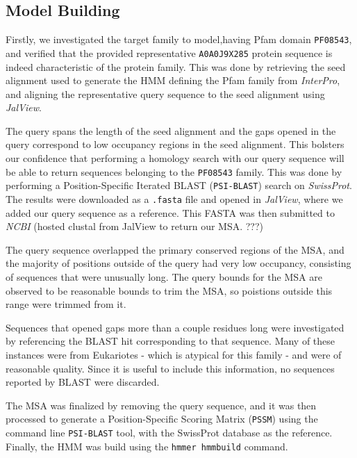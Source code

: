 \documentclass[10pt,twocolumn,letterpaper]{article}
\begin{document}
\subsection{Model Building}

Firstly, we investigated the target family to model,having Pfam domain \texttt{PF08543}, and verified that the provided representative \texttt{A0A0J9X285} protein sequence is indeed characteristic of the protein family. 
This was done by retrieving the seed alignment used to generate the HMM defining the Pfam family from \textit{InterPro}, and aligning the representative query sequence to the seed alignment using \textit{JalView}.

The query spans the length of the seed alignment and the gaps opened in the query correspond to low occupancy regions in the seed alignment. This bolsters our confidence that performing a homology search with our query sequence will be able to return sequences belonging to the \texttt{PF08543} family. This was done by performing a Position-Specific Iterated BLAST (\texttt{PSI-BLAST}) search on \textit{SwissProt}. The results were downloaded as a \texttt{.fasta} file and opened in \textit{JalView}, where we added our query sequence as a reference. This FASTA was then submitted to \textit{NCBI} (hosted clustal from JalView to return our MSA. ???)

The query sequence overlapped the primary conserved regions of the MSA, and the majority of positions outside of the query had very low occupancy, consisting of sequences that were unusually long. The query bounds for the MSA are observed to be reasonable bounds to trim the MSA, so poistions outside this range were trimmed from it.

Sequences that opened gaps more than a couple residues long were investigated by referencing the BLAST hit corresponding to that sequence. Many of these instances were from Eukariotes - which is atypical for this family - and were of reasonable quality. Since it is useful to include this information, no sequences reported by BLAST were discarded.

The MSA was finalized by removing the query sequence, and it was then processed to generate a Position-Specific Scoring Matrix (\texttt{PSSM}) using the command line \texttt{PSI-BLAST} tool, with the SwissProt database as the reference. Finally, the HMM was build using the \texttt{hmmer hmmbuild} command.

\end{document}
